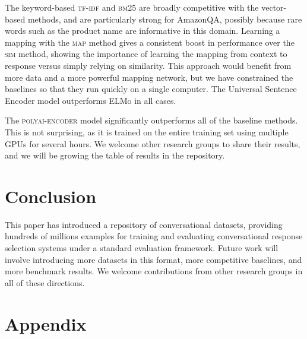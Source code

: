 \documentclass[11pt,a4paper,table]{article}
\newcommand\encoder{polyai-encoder}
\newcommand\encoder{encoder}
\begin{document}
The keyword-based \textsc{tf-idf} and \textsc{bm25} are broadly competitive with the vector-based methods, and are particularly strong for AmazonQA, possibly because rare words such as the product name are informative in this domain. Learning a mapping with the \textsc{map} method gives a consistent boost in performance over the \textsc{sim} method, showing the importance of learning the mapping from context to response versus simply relying on similarity. This approach would benefit from more data and a more powerful mapping network, but we have constrained the baselines so that they run quickly on a single computer. The Universal Sentence Encoder model outperforms ELMo in all cases.

The \textsc{\encoder} model significantly outperforms all of the baseline methods. This is not surprising, as it is trained on the entire training set using multiple GPUs for several hours. We welcome other research groups to share their results, and we will be growing the table of results in the repository.

\section{Conclusion}

This paper has introduced a repository of conversational datasets, providing hundreds of millions examples for training and evaluating conversational response selection systems under a standard evaluation framework. Future work will involve introducing more datasets in this format, more competitive baselines, and more benchmark results. We welcome contributions from other research groups in all of these directions.  


  


\cleardoublepage
\onecolumn
\appendix

\section{Appendix} \label{app:examples}
\end{document}
